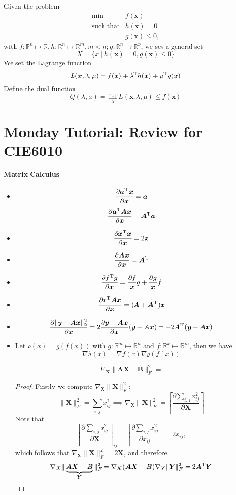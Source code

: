 Given the problem
\begin{equation}\label{Eq:8:2}
\begin{array}{ll}
\min&f(\bm x)\\
\mbox{such that}&h(\bm x)=0\\
&g(\bm x)\le0,
\end{array}
\end{equation}
with $f:\mathbb{R}^n\mapsto\mathbb{R},h:\mathbb{R}^n\mapsto\mathbb{R}^m,m<n;g:\mathbb{R}^n\mapsto\mathbb{R}^p$, we set a general set
\[
X=\{x\mid h(\bm x)=0,g(\bm x)\le0\}
\]
We set the Lagrange function
\[
L(\bm x,\lambda,\mu)=f(\bm x)+\lambda^{\mathrm T} h(\bm x)+\mu^{\mathrm T} g(\bm x)
\]
Define the dual function
\[
Q(\lambda,\mu)=\inf_XL(\bm x,\lambda,\mu)\le 
f(\bm x)
\]


\section{Monday Tutorial: Review for CIE6010}
\paragraph{Matrix Calculus}
\begin{itemize}
\item
\[
\frac{\partial \bm a^{\mathrm T}\bm x}{\partial \bm x}=\bm a
\]
\[
\frac{\partial\bm a^{\mathrm T}\bm A\bm x}{\partial\bm x}=\bm A^{\mathrm T}\bm a
\]
\item
\[
\frac{\partial\bm x^{\mathrm T}\bm x}{\partial \bm x}=2\bm x
\]
\item
\[
\frac{\partial{\bm{Ax}}}{\partial\bm x}=\bm A^{\mathrm T}
\]
\item
\[
\frac{\partial f^{\mathrm T} g}{\partial\bm x}=\frac{\partial f}{\bm x}g+\frac{\partial g}{\bm x}f
\]
\item
\[
\frac{\partial x^{\mathrm T}\bm{Ax}}{\partial\bm x}=(\bm A+\bm A^{\mathrm T})\bm x
\]
\item
\[
\frac{\partial\|\bm y-\bm{Ax}\|_2^2}{\partial\bm x}=2\frac{\partial{\bm y-\bm{Ax}}}{\partial\bm x}(\bm y-\bm{Ax})=-2\bm A^{\mathrm T}(\bm y-\bm{Ax})
\]
\item
\begin{proposition}
Let $h(x)=g(f(x))$ with $g:\mathbb{R}^m\mapsto\mathbb{R}^n$ and $f:\mathbb{R}^k\mapsto\mathbb{R}^m$, then we have
\begin{equation}
\nabla h(x)=\nabla f(x)\nabla g(f(x))\label{Eq:8:4}
\end{equation}
\end{proposition}
\[
\nabla_{\bm X}\|\bm{AX}-\bm B\|_F^2=
\]
\begin{proof}
Firstly we compute $\nabla_{\bm X}\|\bm X\|_F^2$:
\[
\|\bm X\|_F^2=\sum_{i,j}x_{ij}^2\implies
\nabla_{\bm X}\|\bm X\|_F^2=\left[\frac{\partial\sum_{i,j} x_{ij}^2}{\partial\bm X}\right]
\]
Note that
\[
\left[\frac{\partial\sum_{i,j} x_{ij}^2}{\partial\bm X}\right]_{ij}=
\left[\frac{\partial\sum_{i,j} x_{ij}^2}{\partial x_{ij}}\right]=2x_{ij},
\]
which follows that $\nabla_{\bm X}\|\bm X\|_F^2=2\bm X$, and therefore
\[
\nabla_{\bm X}\|\underbrace{\bm{AX}-\bm B}_{\bm Y}\|_F^2=
\nabla_{\bm X}(\bm{AX}-\bm B)\nabla_{\bm Y}\|\bm Y\|_F^2=2\bm A^{\mathrm T}\bm Y
\]
\end{proof}
\end{itemize}
